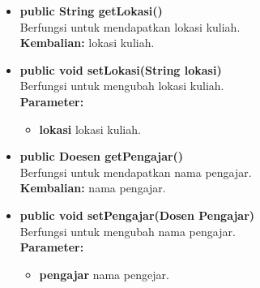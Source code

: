 \begin{enumerate}
\begin{enumerate}
\begin{itemize}
			\item \textbf{public String getLokasi()}\\
				Berfungsi untuk mendapatkan lokasi kuliah.\\
				\textbf{Kembalian:} lokasi kuliah.

			\item \textbf{public void setLokasi(String lokasi)}\\
				Berfungsi untuk mengubah lokasi kuliah.\\
				\textbf{Parameter:}
				\begin{itemize}
					\item \textbf{lokasi} lokasi kuliah.
				\end{itemize}
				
			\item \textbf{public Doesen getPengajar()}\\
				Berfungsi untuk mendapatkan nama pengajar.\\
				\textbf{Kembalian:} nama pengajar.

			\item \textbf{public void setPengajar(Dosen Pengajar)}\\
				Berfungsi untuk mengubah nama pengajar.\\
				\textbf{Parameter:}
				\begin{itemize}
					\item \textbf{pengajar} nama pengejar.
				\end{itemize}
		\end{itemize}
		

\end{enumerate}
\end{enumerate}
